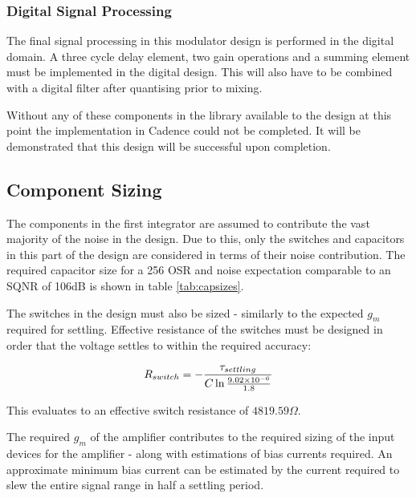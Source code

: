         \subsubsection{Digital Signal Processing}
        The final signal processing in this modulator design is performed in the digital domain.
        A three cycle delay element, two gain operations and a summing element must be implemented in the digital design.
        This will also have to be combined with a digital filter after quantising prior to mixing.

        Without any of these components in the library available to the design at this point the implementation in Cadence could not be completed.
        It will be demonstrated that this design will be successful upon completion.

    \subsection{Component Sizing}
    \label{Design:components}
    The components in the first integrator are assumed to contribute the vast majority of the noise in the design.
    Due to this, only the switches and capacitors in this part of the design are considered in terms of their noise contribution.
    The required capacitor size for a 256 OSR and noise expectation comparable to an SQNR of 106dB is shown in table \ref{tab:capsizes}.

    The switches in the design must also be sized - similarly to the expected $g_{m}$ required for settling.
    Effective resistance of the switches must be designed in order that the voltage settles to within the required accuracy:   

    \begin{align}
        R_{switch}  = -\frac{\tau_{settling}}{C \ln{\frac{9.02\ensuremath{\times 10^{-6}}}{1.8}}}
    \end{align}

    This evaluates to an effective switch resistance of $4819.59\Omega$.

    The required $g_{m}$ of the amplifier contributes to the required sizing of the input devices for the amplifier - along with estimations of bias currents required.
    An approximate minimum bias current can be estimated by the current required to slew the entire signal range in half a settling period.
    
